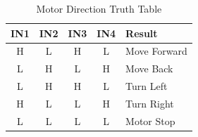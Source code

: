 \begin{table}[htbp]
\caption{Motor Direction Truth Table}
\centering
\begin{tabular}{ccccl}
\toprule
\textbf{IN1} & \textbf{IN2} & \textbf{IN3} & \textbf{IN4} & \textbf{Result} \\
\midrule
H & L & H & L & Move Forward \\
L & H & L & H & Move Back    \\
L & H & H & L & Turn Left    \\
H & L & L & H & Turn Right   \\
L & L & L & L & Motor Stop   \\
\bottomrule
\end{tabular}
\label{tab:truth}
\end{table}